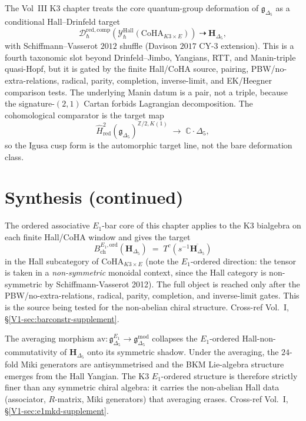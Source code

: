 \begin{remark}
\label{rem:oackd-core-hall-drinfeld}
The Vol~III K3 chapter treats the core quantum-group deformation of
$\mathfrak{g}_{\Delta_5}$ as a conditional Hall--Drinfeld target
\[
\mathcal{D}_\hbar^{\mathrm{red},\mathrm{comp}}
  (\mathcal{Y}^{\mathrm{Hall}}_\hbar(\mathrm{CoHA}_{K3 \times E}))
\;\dashrightarrow\;
\mathbf H_{\Delta_5},
\]
with Schiffmann--Vasserot $2012$ shuffle (Davison $2017$ CY-$3$
extension). This is a fourth taxonomic slot beyond Drinfeld--Jimbo,
Yangians, RTT, and Manin-triple quasi-Hopf, but it is gated by the
finite Hall/CoHA source, pairing, PBW/no-extra-relations, radical,
parity, completion, inverse-limit, and EK/Heegner comparison tests.
The underlying Manin datum is a pair, not a triple, because the
signature-$(2,1)$ Cartan forbids Lagrangian decomposition. The
cohomological comparator is the target map
\[
\widehat H^2_{\mathrm{red}}\!
  \left(\mathfrak{g}_{\Delta_5}\right)^{\mathbb{Z}/2, K(1)}
\;\longrightarrow\;
\mathbb{C} \cdot \Delta_5,
\]
so the Igusa cusp form is the automorphic target line, not the bare
deformation class.
\end{remark}

\section{Synthesis (continued)}
\label{sec:oackd-deep}

\begin{remark}
\label{rem:oackd-deep-1}
The ordered associative $E_1$-bar core of this chapter applies to the
K3 bialgebra on each finite Hall/CoHA window and gives the target
\[
B^{E_1,\mathrm{ord}}_{\mathrm{ch}}(\mathbf H_{\Delta_5}) \;=\; T^c(s^{-1}\overline{\mathbf H_{\Delta_5}})
\]
in the Hall subcategory of $\mathrm{CoHA}_{K3\times E}$ (note the
$E_1$-ordered direction: the tensor is taken in a \emph{non-symmetric}
monoidal context, since the Hall category is non-symmetric by
Schiffmann-Vasserot 2012). The full object is reached only after the
PBW/no-extra-relations, radical, parity, completion, and inverse-limit
gates. This is the source being tested for the non-abelian chiral
structure. Cross-ref Vol.~I,
\S\ref{V1-sec:barconstr-supplement}.
\end{remark}

\begin{remark}
\label{rem:oackd-deep-2}
The averaging morphism
$\mathrm{av}:\mathfrak g^{E_1}_{\Delta_5}\to\mathfrak g^{\mathrm{mod}}_{\Delta_5}$
collapses the $E_1$-ordered Hall-non-commutativity of
$\mathbf H_{\Delta_5}$ onto its symmetric shadow. Under the averaging,
the $24$-fold Miki generators are antisymmetrised and the BKM
Lie-algebra structure emerges from the Hall Yangian. The K3
$E_1$-ordered structure is therefore strictly finer than any
symmetric chiral algebra: it carries the non-abelian Hall data
(associator, $R$-matrix, Miki generators) that averaging erases.
Cross-ref Vol.~I, \S\ref{V1-sec:e1mkd-supplement}.
\end{remark}
